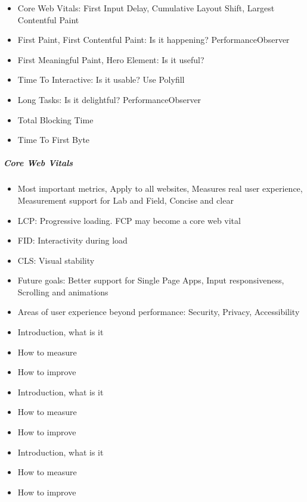 \begin{itemize}
\item Core Web Vitals: First Input Delay, Cumulative Layout Shift, Largest Contentful Paint
\item First Paint, First Contentful Paint: Is it happening? PerformanceObserver
\item First Meaningful Paint, Hero Element: Is it useful? 
\item Time To Interactive: Is it usable? Use Polyfill
\item Long Tasks: Is it delightful? PerformanceObserver
\item Total Blocking Time
\item Time To First Byte
\end{itemize}


\subparagraph{Core Web Vitals}

\begin{itemize}
\item Most important metrics, Apply to all websites, Measures real user experience, Measurement support for Lab and Field, Concise and clear
\item LCP: Progressive loading. FCP may become a core web vital
\item FID: Interactivity during load
\item CLS: Visual stability
\item Future goals: Better support for Single Page Apps, Input responsiveness, Scrolling and animations
\item Areas of user experience beyond performance: Security, Privacy, Accessibility
\end{itemize}

\begin{itemize}
\item Introduction, what is it
\item How to measure
\item How to improve
\end{itemize}

\begin{itemize}
\item Introduction, what is it
\item How to measure
\item How to improve
\end{itemize}

\begin{itemize}
\item Introduction, what is it
\item How to measure
\item How to improve
\end{itemize}


